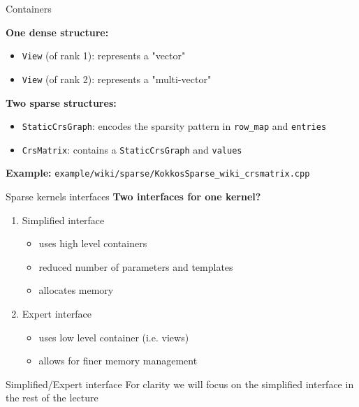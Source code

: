 \begin{frame}[fragile]{Containers}

\textbf{One dense structure:}
\begin{itemize}
\item \texttt{View} (of rank 1): represents a "vector"
\item \texttt{View} (of rank 2): represents a "multi-vector"
\end{itemize}

\vspace{1em}
\textbf{Two sparse structures:}
\begin{itemize}
  \item \texttt{StaticCrsGraph}: encodes the sparsity pattern in \texttt{row\_map} and \texttt{entries}
  \item \texttt{CrsMatrix}: contains a \texttt{StaticCrsGraph} and \texttt{values}
\end{itemize}

\vspace{1em}
\textbf{Example:}
\texttt{example/wiki/sparse/KokkosSparse\_wiki\_crsmatrix.cpp}
\end{frame}

\begin{frame}{Sparse kernels interfaces}
  \textbf{Two interfaces for one kernel?}
  \begin{enumerate}
  \item Simplified interface
    \begin{itemize}
    \item uses high level containers
    \item reduced number of parameters and templates
    \item allocates memory
    \end{itemize}
  \item Expert interface
    \begin{itemize}
    \item uses low level container (i.e. views)
    \item allows for finer memory management
    \end{itemize}
  \end{enumerate}

\begin{block}{Simplified/Expert interface}
  For clarity we will focus on the simplified interface in the rest of the lecture
\end{block}
\end{frame}

